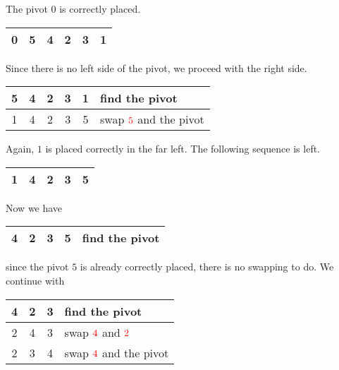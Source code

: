 The pivot \(0\) is correctly placed.

\begin{center}
    \begin{tabular}{ || c || c | c | c | c | c | }
        \hline
        \cellcolor{LightCyan}0 & 5 & 4 & 2 & 3 & 1 \\ \hline
    \end{tabular}
\end{center}

Since there is no left side of the pivot, we proceed with the right side.

\begin{center}
    \begin{tabular}{ | c | c | c | c | c | l | }
        \hline
        5 & 4 & 2 & 3 & \cellcolor{LightCyan}1 & find the {\color{cyan}pivot} \\ \hline
        \color{cyan}1 & 4 & 2 & 3 & \color{red}5 & swap \(\color{red}5\) and the {\color{cyan}pivot} \\ \hline
    \end{tabular}
\end{center}

Again, \(1\) is placed correctly in the far left. The following sequence is left.

\begin{center}
    \begin{tabular}{ | c | c | c | c | c | }
        \hline
        \cellcolor{LightCyan}1 & 4 & 2 & 3 & 5 \\ \hline
    \end{tabular}
\end{center}

Now we have

\begin{center}
    \begin{tabular}{ | c | c | c | c | l | }
        \hline
        4 & 2 & 3 & \cellcolor{LightCyan}5 & find the {\color{cyan}pivot} \\ \hline
    \end{tabular}
\end{center}

since the pivot \(5\) is already correctly placed, there is no swapping to do. We continue with

\begin{center}
    \begin{tabular}{ | c | c | c | l | }
        \hline
        4 & 2 & \cellcolor{LightCyan}3 & find the {\color{cyan}pivot} \\ \hline
        \color{red}2 & \color{red}4 & \cellcolor{LightCyan}3 & swap \(\color{red}4\) and \(\color{red}2\) \\ \hline
        2 & \color{cyan}3 & \color{red}4 & swap \(\color{red}4\) and the {\color{cyan}pivot} \\ \hline
    \end{tabular}
\end{center}

